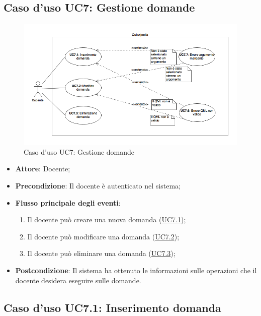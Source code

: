 \documentclass[12pt,a4paper]{article}
\begin{document}
\subsection{Caso d'uso UC7: Gestione domande}
\begin{figure}[H]
	\centering
	\includegraphics[width=\textwidth]{../img/diagramUC7.png}
	\caption{Caso d'uso UC7: Gestione domande}\label{fig:UC7} 
\end{figure}
\begin{itemize}

\item \textbf{Attore}: Docente; 
\item \textbf{Precondizione}: Il docente è autenticato nel sistema;

\item \textbf{Flusso principale degli eventi}:
\begin{enumerate}
	\item Il docente può creare una nuova domanda (\hyperlink{UC7.1}{UC7.1});
	\item Il docente può modificare una domanda (\hyperlink{UC7.2}{UC7.2});
	\item Il docente può eliminare una domanda (\hyperlink{UC7.3}{UC7.3});
	
\end{enumerate}
\item \textbf{Postcondizione}: Il sistema ha ottenuto le informazioni sulle operazioni che il docente desidera eseguire sulle domande.
\end{itemize}
\hypertarget{UC7.1}{}
\subsection{Caso d'uso UC7.1: Inserimento domanda}
\end{document}
